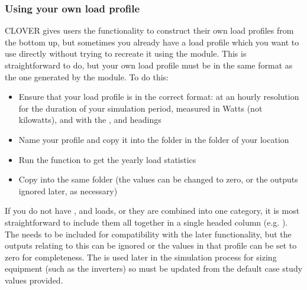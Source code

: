 \documentclass[letterpaper,10pt,english]{sphinxmanual}
\begin{document}
\subsubsection{Using your own load profile}
\label{\detokenize{load:using-your-own-load-profile}}
\sphinxAtStartPar
CLOVER gives users the functionality to construct their own load
profiles from the bottom up, but sometimes you already have a load
profile which you want to use directly without trying to recreate it
using the  module. This is straightforward to do, but your own
load profile must be in the same format as the one generated by the
 module. To do this:
\begin{itemize}
\item {} 
\sphinxAtStartPar
Ensure that your load profile is in the correct format: at an hourly
resolution for the duration of your simulation period, measured in
Watts (not kilowatts), and with the ,  and
 headings

\item {} 
\sphinxAtStartPar
Name your profile  and copy it into the  folder in the  folder of your location

\item {} 
\sphinxAtStartPar
Run the function
 to get the
yearly load statistics

\item {} 
\sphinxAtStartPar
Copy  into the same folder (the values can be
changed to zero, or the outputs ignored later, as necessary)

\end{itemize}

\sphinxAtStartPar
If you do not have ,  and  loads, or
they are combined into one category, it is most straightforward to
include them all together in a single headed column (e.g. ).
The  needs to be included for compatibility with
the later functionality, but the outputs relating to this can be ignored
or the values in that profile can be set to zero for completeness. The
 is used later in
the simulation process for sizing equipment (such as the inverters) so
must be updated from the default case study values provided.
\end{document}
